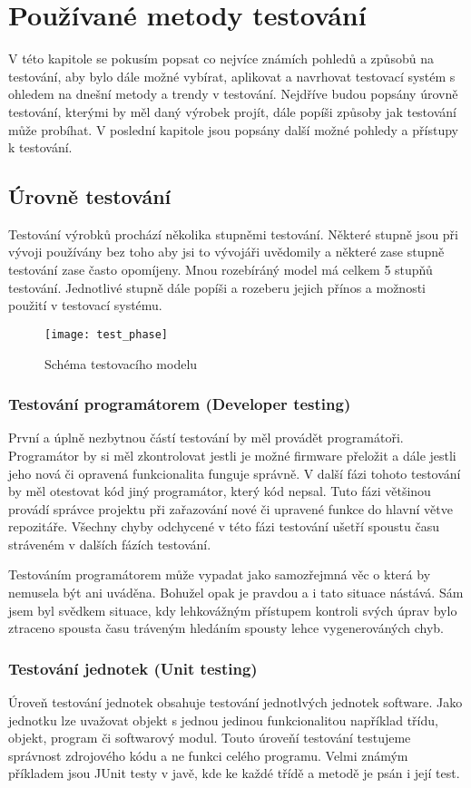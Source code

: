 \chapter{Používané metody testování}
V této kapitole se pokusím popsat co nejvíce známích pohledů a způsobů na testování, aby bylo dále možné vybírat, aplikovat a navrhovat testovací systém s ohledem na dnešní metody a trendy v testování. Nejdříve budou popsány úrovně testování, kterými by měl daný výrobek projít, dále popíši způsoby jak testování může probíhat. V poslední kapitole jsou popsány další možné pohledy a přístupy k testování.

\section{Úrovně testování}
Testování výrobků prochází několika stupněmi testování. Některé stupně jsou při vývoji používány bez toho aby jsi to vývojáři uvědomily a některé zase stupně testování zase často opomíjeny. Mnou rozebíráný model má celkem 5 stupňů testování.  Jednotlivé stupně dále popíši a rozeberu jejich přínos a možnosti použití v testovací systému.

\begin{figure}[h]
  \centering
  \texttt{[image: test\_phase]}
  \caption{Schéma testovacího modelu}
  \label{fig:test_phase}
\end{figure}

\subsection{Testování programátorem (Developer testing)}
První a úplně nezbytnou částí testování by měl provádět programátoři. Programátor by si měl zkontrolovat jestli je možné firmware přeložit a dále jestli jeho nová či opravená funkcionalita funguje správně. V další fázi tohoto testování by měl otestovat kód jiný programátor, který kód nepsal. Tuto fázi většinou provádí správce projektu při zařazování nové či upravené funkce do hlavní větve repozitáře. Všechny chyby odchycené v této fázi testování ušetří spoustu času stráveném v dalších fázích testování.

Testováním programátorem může vypadat jako samozřejmná věc o která by nemusela být ani uváděna. Bohužel opak je pravdou a i tato situace nástává. Sám jsem byl svědkem situace, kdy lehkovážným přístupem kontroli svých úprav bylo ztraceno spousta času tráveným hledáním spousty lehce vygenerováných chyb.

\subsection{Testování jednotek (Unit testing)}
Úroveň testování jednotek obsahuje testování jednotlvých jednotek software. Jako jednotku lze uvažovat objekt s jednou jedinou funkcionalitou například třídu, objekt, program či softwarový modul. Touto úroveňí testování testujeme správnost zdrojového kódu a ne funkci celého programu. Velmi známým příkladem jsou JUnit testy v javě, kde ke každé třídě a metodě je psán i její test.

